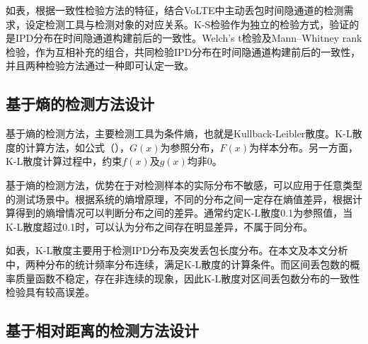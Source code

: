 如表，根据一致性检验方法的特征，结合VoLTE中主动丢包时间隐通道的检测需求，设定检测工具与检测对象的对应关系。K-S检验作为独立的检验方式，验证的是IPD分布在时间隐通道构建前后的一致性。Welch's t检验及Mann–Whitney rank检验，作为互相补充的组合，共同检验IPD分布在时间隐通道构建前后的一致性，并且两种检验方法通过一种即可认定一致。

\subsection{基于熵的检测方法设计}
\label{chap:analyze:statistical:entropy}

基于熵的检测方法，主要检测工具为条件熵，也就是Kullback-Leibler散度。K-L散度的计算方法，如公式（），$G(x)$为参照分布，$F(x)$为样本分布。另一方面，K-L散度计算过程中，约束$f(x)$及$g(x)$均非0。

基于熵的检测方法，优势在于对检测样本的实际分布不敏感，可以应用于任意类型的测试场景中。根据系统的熵增原理，不同的分布之间一定存在熵值差异，根据计算得到的熵增情况可以判断分布之间的差异。通常约定K-L散度0.1为参照值，当K-L散度超过0.1时，可以认为分布之间存在明显差异，不属于同分布。


如表，K-L散度主要用于检测IPD分布及突发丢包长度分布。在本文及本文分析中，两种分布的统计频率分布连续，满足K-L散度的计算条件。而区间丢包数的概率质量函数不稳定，存在非连续的现象，因此K-L散度对区间丢包数分布的一致性检验具有较高误差。

\subsection{基于相对距离的检测方法设计}
\label{chap:analyze:statistical:distance}


